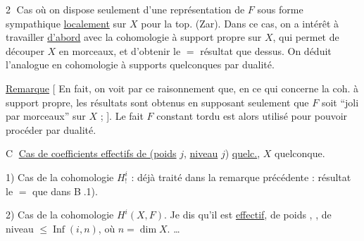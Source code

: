 \textcircled{2} Cas où on dispose seulement d'une représentation de $F$ sous forme sympathique \uline{localement} sur $X$ pour la top. (Zar). Dans ce cas, 
on a intérêt à travailler \uline{d'abord} avec la cohomologie à support propre sur $X$, qui permet de découper $X$ en morceaux, et d'obtenir le $=$ résultat que dessus. On déduit l'analogue en cohomologie à supports quelconques par dualité.

\uline{Remarque} [ En fait, on voit par ce raisonnement que, en ce qui concerne la coh. à support propre, les résultats sont obtenus en supposant seulement que $F$ soit \textquotedblleft joli par morceaux\textquotedblright{} sur $X$ ;  ]. Le fait $F$ constant tordu  est alors utilisé  pour pouvoir procéder par dualité.

\textcircled{C} \uline{Cas de coefficients effectifs de (poids} $j$, \uline{niveau} $j$) \uline{quelc.}, $X$ quelconque.

1) Cas de la cohomologie $H^i_!$ : déjà traité dans la remarque précédente : résultat le $=$ que dans \textcircled{B}.1).

2) Cas de la cohomologie $H^i(X,F)$. Je dis qu'il est \uline{effectif}, de poids , , de niveau $\le\operatorname{Inf}(i,n)$, où $n=\dim X$.  \ldots
{}
